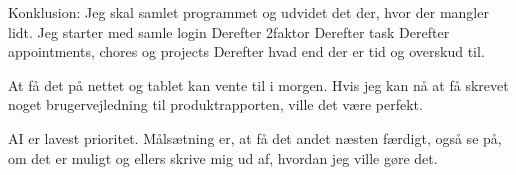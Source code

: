 \documentclass{report}
\begin{document}
Konklusion:
Jeg skal samlet programmet og udvidet det der, hvor der mangler lidt.
Jeg starter med samle login
Derefter 2faktor
Derefter task
Derefter appointments, chores og projects
Derefter hvad end der er tid og overskud til.

At få det på nettet og tablet kan vente til i morgen.
Hvis jeg kan nå at få skrevet noget brugervejledning til produktrapporten, ville det være perfekt.

AI er lavest prioritet.
Målsætning er, at få det andet næsten færdigt, også se på, om det er muligt og ellers skrive mig ud af, hvordan jeg ville gøre det.







	
\end{document}

